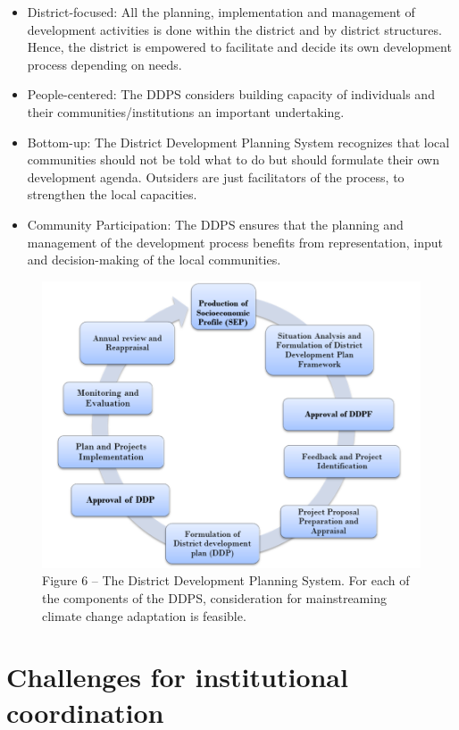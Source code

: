 \documentclass[
]{book}
\begin{document}
\begin{itemize}
\item
  District-focused: All the planning, implementation and management of development activities is done within the district and by district structures. Hence, the district is empowered to facilitate and decide its own development process depending on needs.
\item
  People-centered: The DDPS considers building capacity of individuals and their communities/institutions an important undertaking.
\item
  Bottom-up: The District Development Planning System recognizes that local communities should not be told what to do but should formulate their own development agenda. Outsiders are just facilitators of the process, to strengthen the local capacities.
\item
  Community Participation: The DDPS ensures that the planning and management of the development process benefits from representation, input and decision-making of the local communities.
\end{itemize}

\begin{figure}
\centering
\includegraphics{images/district_dvpt_sys.png}
\caption{Figure 6 -- The District Development Planning System. For each of the components of the DDPS, consideration for mainstreaming climate change adaptation is feasible.}
\end{figure}

\hypertarget{challenges-for-institutional-coordination}{%
\section{Challenges for institutional coordination}\label{challenges-for-institutional-coordination}}
\end{document}
